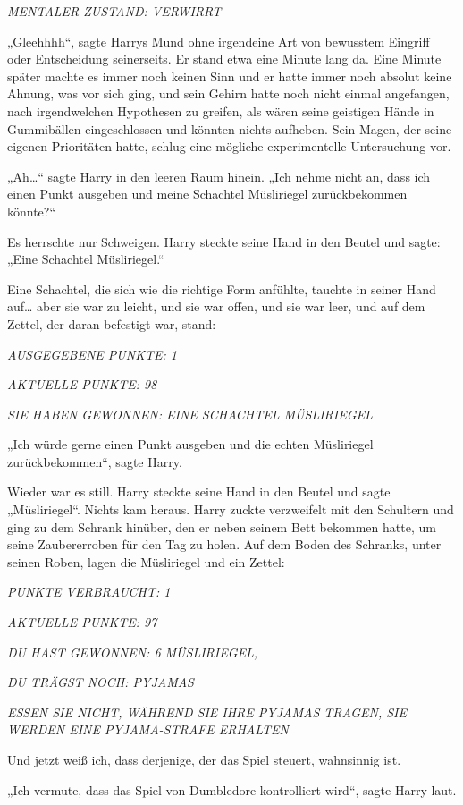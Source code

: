 {\emph{MENTALER ZUSTAND: VERWIRRT}

„Gleehhhh“, sagte Harrys Mund ohne irgendeine Art von bewusstem Eingriff oder Entscheidung seinerseits. Er stand etwa eine Minute lang da. Eine Minute später machte es immer noch keinen Sinn und er hatte immer noch absolut keine Ahnung, was vor sich ging, und sein Gehirn hatte noch nicht einmal angefangen, nach irgendwelchen Hypothesen zu greifen, als wären seine geistigen Hände in Gummibällen eingeschlossen und könnten nichts aufheben. Sein Magen, der seine eigenen Prioritäten hatte, schlug eine mögliche experimentelle Untersuchung vor.

„Ah…“ sagte Harry in den leeren Raum hinein. „Ich nehme nicht an, dass ich einen Punkt ausgeben und meine Schachtel Müsliriegel zurückbekommen könnte?“

Es herrschte nur Schweigen. Harry steckte seine Hand in den Beutel und sagte: „Eine Schachtel Müsliriegel.“

Eine Schachtel, die sich wie die richtige Form anfühlte, tauchte in seiner Hand auf… aber sie war zu leicht, und sie war offen, und sie war leer, und auf dem Zettel, der daran befestigt war, stand:

\emph{AUSGEGEBENE PUNKTE: 1}

\emph{AKTUELLE PUNKTE: 98}

\emph{SIE HABEN GEWONNEN: EINE SCHACHTEL MÜSLIRIEGEL}

„Ich würde gerne einen Punkt ausgeben und die echten Müsliriegel zurückbekommen“, sagte Harry.

Wieder war es still. Harry steckte seine Hand in den Beutel und sagte „Müsliriegel“. Nichts kam heraus. Harry zuckte verzweifelt mit den Schultern und ging zu dem Schrank hinüber, den er neben seinem Bett bekommen hatte, um seine Zaubererroben für den Tag zu holen. Auf dem Boden des Schranks, unter seinen Roben, lagen die Müsliriegel und ein Zettel:

\emph{PUNKTE VERBRAUCHT: 1}

\emph{AKTUELLE PUNKTE: 97}

\emph{DU HAST GEWONNEN: 6 MÜSLIRIEGEL,}

\emph{DU TRÄGST NOCH: PYJAMAS}

\emph{ESSEN SIE NICHT, WÄHREND SIE IHRE PYJAMAS TRAGEN, SIE WERDEN EINE PYJAMA-STRAFE ERHALTEN}

Und jetzt weiß ich, dass derjenige, der das Spiel steuert, wahnsinnig ist.

„Ich vermute, dass das Spiel von Dumbledore kontrolliert wird“, sagte Harry laut.

}
